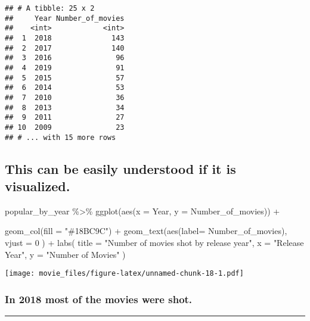 \documentclass[
]{article}
\newenvironment{Shaded}{\begin{snugshade}}{\end{snugshade}}
\newcommand{\AttributeTok}[1]{\textcolor[rgb]{0.77,0.63,0.00}{#1}}
\newcommand{\DecValTok}[1]{\textcolor[rgb]{0.00,0.00,0.81}{#1}}
\newcommand{\FunctionTok}[1]{\textcolor[rgb]{0.00,0.00,0.00}{#1}}
\newcommand{\NormalTok}[1]{#1}
\newcommand{\SpecialCharTok}[1]{\textcolor[rgb]{0.00,0.00,0.00}{#1}}
\newcommand{\StringTok}[1]{\textcolor[rgb]{0.31,0.60,0.02}{#1}}
\begin{document}
\begin{verbatim}
## # A tibble: 25 x 2
##     Year Number_of_movies
##    <int>            <int>
##  1  2018              143
##  2  2017              140
##  3  2016               96
##  4  2019               91
##  5  2015               57
##  6  2014               53
##  7  2010               36
##  8  2013               34
##  9  2011               27
## 10  2009               23
## # ... with 15 more rows
\end{verbatim}

\hypertarget{this-can-be-easily-understood-if-it-is-visualized.}{%
\subsection{This can be easily understood if it is
visualized.}\label{this-can-be-easily-understood-if-it-is-visualized.}}

\begin{Shaded}
\begin{Highlighting}[]
\NormalTok{popular\_by\_year }\SpecialCharTok{\%\textgreater{}\%}
  \FunctionTok{ggplot}\NormalTok{(}\FunctionTok{aes}\NormalTok{(}\AttributeTok{x =}\NormalTok{ Year, }\AttributeTok{y =}\NormalTok{ Number\_of\_movies)) }\SpecialCharTok{+}
  
  \FunctionTok{geom\_col}\NormalTok{(}\AttributeTok{fill =} \StringTok{"\#18BC9C"}\NormalTok{) }\SpecialCharTok{+}
  \FunctionTok{geom\_text}\NormalTok{(}\FunctionTok{aes}\NormalTok{(}\AttributeTok{label=}\NormalTok{ Number\_of\_movies), }\AttributeTok{vjust =} \DecValTok{0}\NormalTok{ ) }\SpecialCharTok{+}
  \FunctionTok{labs}\NormalTok{(}
    \AttributeTok{title =} \StringTok{"Number of movies shot by release year"}\NormalTok{,}
    \AttributeTok{x =} \StringTok{"Release Year"}\NormalTok{,}
    \AttributeTok{y =} \StringTok{"Number of Movies"}
\NormalTok{  )}
\end{Highlighting}
\end{Shaded}

\texttt{[image: movie\_files/figure-latex/unnamed-chunk-18-1.pdf]}

\hypertarget{in-2018-most-of-the-movies-were-shot.}{%
\subsubsection{\texorpdfstring{\textbf{In 2018 most of the movies were
shot.}}{In 2018 most of the movies were shot.}}\label{in-2018-most-of-the-movies-were-shot.}}

\begin{center}\rule{0.5\linewidth}{0.5pt}\end{center}
\end{document}
